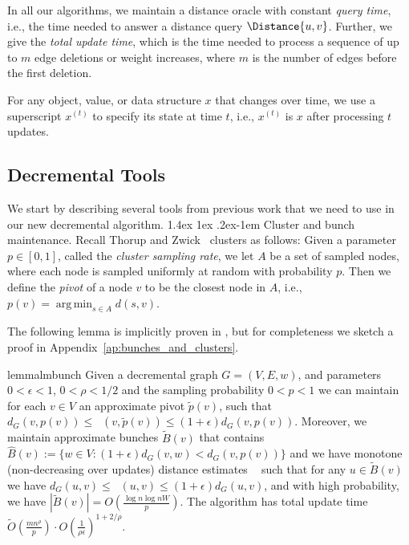 \documentclass[11pt]{article}
\makeatletter
\theoremstyle{definition}
\theoremstyle{remark}
\DeclareMathOperator*{\argmin}{arg\,min}
\DeclareMathOperator{\dLNbunch}{\delta_{\tilde{B}}}
\renewcommand{\paragraph}{%
  \@startsection{paragraph}{4}%
  {\z@}{1.4ex \@plus 1ex \@minus .2ex}{-1em}%
  {\normalfont\normalsize\bfseries}%
}
\makeatother
\begin{document}
In all our algorithms, we maintain a distance oracle with constant \emph{query time}, i.e., the time needed to answer a distance query $\Distance{u,v}$.
Further, we give the \emph{total update time}, which is the time needed to process a sequence of up to $m$ edge deletions or weight increases, where $m$ is the number of edges before the first deletion. 

For any object, value, or data structure $x$ that changes over time, we use a superscript $x^{(t)}$ to specify its state at time $t$, i.e., $x^{(t)}$ is $x$ after processing $t$ updates. 



\subsection{Decremental Tools}\label{sc:decr_tools}
We start by describing several tools from previous work that we need to use in our new decremental algorithm.
\paragraph{Cluster and bunch maintenance.} 
Recall Thorup and Zwick~\cite{TZ2005} clusters as follows: Given a parameter $p\in [0,1]$, called the \emph{cluster sampling rate}, we let $A$ be a set of sampled nodes, where each node is sampled uniformly at random with probability $p$. Then we define the \emph{pivot} of a node $v$ to be the closest node in $A$, i.e., $p(v)=\argmin_{s\in A} d(s,v)$. 

The following lemma is implicitly proven in \cite{LN2020}, but for completeness we sketch a proof in Appendix~\ref{ap:bunches_and_clusters}.

\begin{restatable}{lemma}{lmbunch} \label{lm:approx_bunches_on_G}
Given a decremental graph $G=(V,E,w)$, and parameters $0< \epsilon <1$, $0<\rho<1/2$ and the sampling probability $0< p <1$ we can maintain for each $v\in V$ an approximate pivot $\tilde p(v)$, such that $d_G(v,p(v)) \leq \dLNbunch(v,\tilde{p}(v)) \leq (1+\epsilon) d_G(v,p(v))$.
Moreover, we maintain approximate bunches $\tilde{B}(v)$ that contains
$\hat{B}(v):= \{ w \in V : (1+\epsilon)d_G(v,w) < d_G(v, p(v)) \}$ and we have monotone (non-decreasing over updates) distance estimates $\dLNbunch$ such that for any $u \in \tilde{B}(v)$ we have $d_G(u,v) \leq \dLNbunch(u,v) \leq (1+\epsilon) d_G(u,v)$, and with high probability, we have $|\tilde{B}(v)| = O(\frac{\log n\log nW}{p})$. The algorithm has total update time $\tilde O(\tfrac{mn^\rho}{p}) \cdot O(\frac{1}{\rho \epsilon})^{1+2/\rho}$.
\end{restatable}
\end{document}
